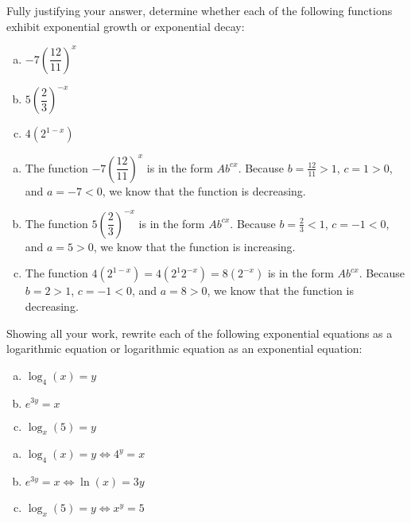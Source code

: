 \documentclass[12pt,letterpaper]{exam}
\begin{document}
\begin{questions}
\newpage
\question[10] Fully justifying your answer, determine whether each of the following functions exhibit exponential growth or exponential decay:
	\begin{enumerate}[(a)]
	\item $-7 \left( \dfrac{12}{11} \right)^x$
	\item $5 \left( \dfrac{2}{3} \right)^{-x}$
	\item $4 (2^{1 - x})$
	\end{enumerate} \pspace

{\itshape
{}
\begin{enumerate}[(a)]
\item The function $-7 \left( \dfrac{12}{11} \right)^x$ is in the form $Ab^{cx}$. Because $b= \frac{12}{11} > 1$, $c= 1 > 0$, and $a= -7 < 0$, we know that the function is decreasing. \pspace

\item The function $5 \left( \dfrac{2}{3} \right)^{-x}$ is in the form $Ab^{cx}$. Because $b= \frac{2}{3} < 1$, $c= -1 < 0$, and $a= 5 > 0$, we know that the function is increasing. \pspace

\item The function $4 (2^{1 - x})= 4( 2^1 2^{-x})= 8(2^{-x})$ is in the form $Ab^{cx}$. Because $b= 2 > 1$, $c= -1 < 0$, and $a= 8 > 0$, we know that the function is decreasing. 
\end{enumerate}
}



\newpage
\question[10] Showing all your work, rewrite each of the following exponential equations as a logarithmic equation or logarithmic equation as an exponential equation:
	\begin{enumerate}[(a)]
	\item $\log_4(x)= y$
	\item $e^{3y}= x$
	\item $\log_x(5)= y$
	\end{enumerate} \pspace

{\itshape
{}
\begin{enumerate}[(a)]
\item $\log_4(x)= y \Longleftrightarrow 4^y= x$ \pspace

\item $e^{3y}= x \Longleftrightarrow \ln(x)= 3y$ \pspace

\item $\log_x(5)= y \Longleftrightarrow x^y= 5$
\end{enumerate}
}




\end{questions}
\end{document}
